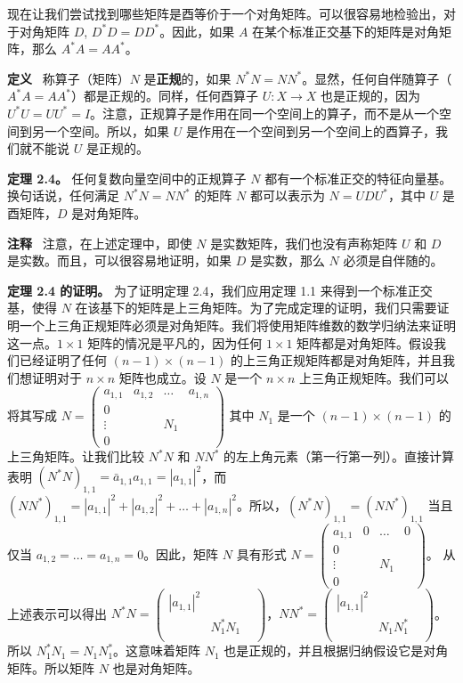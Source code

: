 现在让我们尝试找到哪些矩阵是酉等价于一个对角矩阵。可以很容易地检验出，对于对角矩阵 $D$, $D^*D = DD^*$。因此，如果 $A$ 在某个标准正交基下的矩阵是对角矩阵，那么 $A^*A = AA^*$。

\textbf{定义}~ 称算子（矩阵）$N$ 是\textbf{正规}的，如果 $N^*N = NN^*$。显然，任何自伴随算子（$A^*A = AA^*$）都是正规的。同样，任何酉算子 $U: X \to X$ 也是正规的，因为 $U^*U = UU^* = I$。注意，正规算子是作用在同一个空间上的算子，而不是从一个空间到另一个空间。所以，如果 $U$ 是作用在一个空间到另一个空间上的酉算子，我们就不能说 $U$ 是正规的。

\textbf{定理 2.4。} 任何复数向量空间中的正规算子 $N$ 都有一个标准正交的特征向量基。换句话说，任何满足 $N^*N = NN^*$ 的矩阵 $N$ 都可以表示为 $N = UDU^*$，其中 $U$ 是酉矩阵，$D$ 是对角矩阵。

\textbf{注释} ~注意，在上述定理中，即使 $N$ 是实数矩阵，我们也没有声称矩阵 $U$ 和 $D$ 是实数。而且，可以很容易地证明，如果 $D$ 是实数，那么 $N$ 必须是自伴随的。



\textbf{定理 2.4 的证明。} 为了证明定理 2.4，我们应用定理 1.1 来得到一个标准正交基，使得 $N$ 在该基下的矩阵是上三角矩阵。为了完成定理的证明，我们只需要证明一个上三角正规矩阵必须是对角矩阵。我们将使用矩阵维数的数学归纳法来证明这一点。$1 \times 1$ 矩阵的情况是平凡的，因为任何 $1 \times 1$ 矩阵都是对角矩阵。假设我们已经证明了任何 $(n-1) \times (n-1)$ 的上三角正规矩阵都是对角矩阵，并且我们想证明对于 $n \times n$ 矩阵也成立。设 $N$ 是一个 $n \times n$ 上三角正规矩阵。我们可以将其写成
$N = \begin{pmatrix} a_{1,1} & a_{1,2} & \dots & a_{1,n} \\ 0 & & & \\ \vdots & & N_1 & \\ 0 & & & \end{pmatrix}$
其中 $N_1$ 是一个 $(n-1) \times (n-1)$ 的上三角矩阵。让我们比较 $N^*N$ 和 $NN^*$ 的左上角元素（第一行第一列）。直接计算表明 $(N^*N)_{1,1} = \bar{a}_{1,1}a_{1,1} = |a_{1,1}|^2$，而 $(NN^*)_{1,1} = |a_{1,1}|^2 + |a_{1,2}|^2 + \dots + |a_{1,n}|^2$。所以，$(N^*N)_{1,1} = (NN^*)_{1,1}$ 当且仅当 $a_{1,2} = \dots = a_{1,n} = 0$。因此，矩阵 $N$ 具有形式
$N = \begin{pmatrix} a_{1,1} & 0 & \dots & 0 \\ 0 & & & \\ \vdots & & N_1 & \\ 0 & & & \end{pmatrix}$。
从上述表示可以得出 $N^*N = \begin{pmatrix} |a_{1,1}|^2 & & \\ & N_1^*N_1 & \\ & & \end{pmatrix}$，$NN^* = \begin{pmatrix} |a_{1,1}|^2 & & \\ & N_1N_1^* & \\ & & \end{pmatrix}$。所以 $N_1^*N_1 = N_1N_1^*$。这意味着矩阵 $N_1$ 也是正规的，并且根据归纳假设它是对角矩阵。所以矩阵 $N$ 也是对角矩阵。

